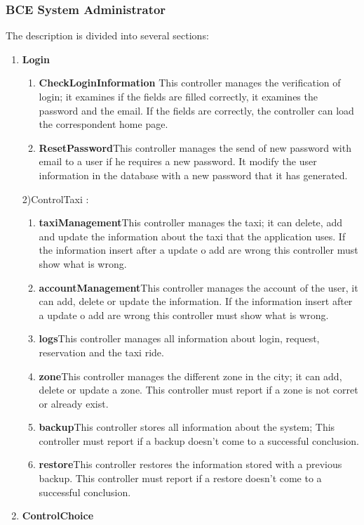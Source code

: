 \documentclass[11pt, a4paper,titlepage]{article}
\begin{document}
\subsubsection{BCE System Administrator}
The description is divided into several sections:
\begin{enumerate}
	\item \textbf{Login}
	\begin{enumerate}
		\item \textbf{CheckLoginInformation} This controller manages the verification of login; it 
		examines if the fields are filled correctly, it examines the password and the email. 
		If the fields are correctly, the controller can load the correspondent home page.
		\item \textbf{ResetPassword}This controller manages the send of new password with email to a 
		user if he requires a new password.
		It modify the user information in the database with a new password that it has 
		generated.
	\end{enumerate}
	2)ControlTaxi :
	\begin{enumerate}
		\item \textbf{taxiManagement}This controller manages the taxi; it can delete, add and update 
		the information about the taxi that the application uses.
		If the information insert after a update o add are wrong this controller must show 
		what is wrong.
		\item \textbf{accountManagement}This controller manages the account of the user, it can add, 
		delete or update the information.
		If the information insert after a update o add are wrong this controller must show 
		what is wrong.
		\item \textbf{logs}This controller manages all information about login, request, reservation  
		and the taxi ride.
		\item \textbf{zone}This controller manages the different zone in the city; it can add, delete 
		or update a zone.
		This controller must report if a zone is not corret or already exist.
		\item \textbf{backup}This controller stores all information about the system;
		This controller must report if a backup doesn’t come to a successful conclusion.
		\item \textbf{restore}This controller restores the information stored with a previous backup.
		This controller must report if a restore doesn’t come to a successful conclusion.
	\end{enumerate}
	\item \textbf{ControlChoice}

\end{enumerate}
\end{document}
